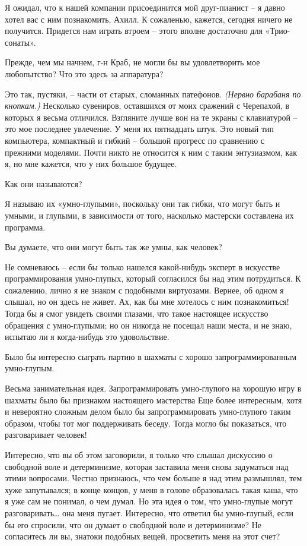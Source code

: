 \documentclass[../main.tex]{subfiles}
\begin{document}
\begin{dialogue}
 Я ожидал, что к нашей компании присоединится мой друг-пианист \--- я давно хотел вас с ним познакомить, Ахилл. К сожаленью, кажется, сегодня ничего не получится. Придется нам играть втроем \--- этого вполне достаточно для «Трио-сонаты».

 Прежде, чем мы начнем, г-н Краб, не могли бы вы удовлетворить мое любопытство? Что это здесь за аппаратура?

 Это так, пустяки, \--- части от старых, сломанных патефонов. \emph{(Нервно барабаня по кнопкам.)} Несколько сувениров, оставшихся от моих сражений с Черепахой, в которых я весьма отличился. Взгляните лучше вон на те экраны с клавиатурой \--- это мое последнее увлечение. У меня их пятнадцать штук. Это новый тип компьютера, компактный и гибкий \--- большой прогресс по сравнению с прежними моделями. Почти никто не относится к ним с таким энтузиазмом, как я, но мне кажется, что у них большое будущее.

 Как они называются?

 Я называю их «умно-глупыми», поскольку они так гибки, что могут быть и умными, и глупыми, в зависимости от того, насколько мастерски составлена их программа.

 Вы думаете, что они могут быть так же умны, как человек?

 Не сомневаюсь \--- если бы только нашелся какой-нибудь эксперт в искусстве программирования умно-глупых, который согласился бы над этим потрудиться. К сожалению, лично я не знаком с подобными виртуозами. Вернее, об одном я слышал, но он здесь не живет. Ах, как бы мне хотелось с ним познакомиться! Тогда бы я смог увидеть своими глазами, что такое настоящее искусство обращения с умно-глупыми; но он никогда не посещал наши места, и не знаю, испытаю ли я когда-нибудь это удовольствие.

 Было бы интересно сыграть партию в шахматы с хорошо запрограммированным умно-глупым.

 Весьма занимательная идея. Запрограммировать умно-глупого на хорошую игру в шахматы было бы признаком настоящего мастерства Еще более интересным, хотя и невероятно сложным делом было бы запрограммировать умно-глупого таким образом, чтобы тот мог поддерживать беседу. Тогда могло бы показаться, что разговаривает человек!

 Интересно, что вы об этом заговорили, я только что слышал дискуссию о свободной воле и детерминизме, которая заставила меня снова задуматься над этими вопросами. Честно признаюсь, что чем больше я над этим размышлял, тем хуже запутывался; в конце концов, у меня в голове образовалась такая каша, что я уже сам не понимал, о чем думал. Но эта идея о том, что умно-глупые могут разговаривать\ldots{} она меня пугает. Интересно, что ответил бы умно-глупый, если бы его спросили, что он думает о свободной воле и детерминизме? Не согласитесь ли вы, знатоки подобных вещей, просветить меня на этот счет?


\end{dialogue}
\end{document}
